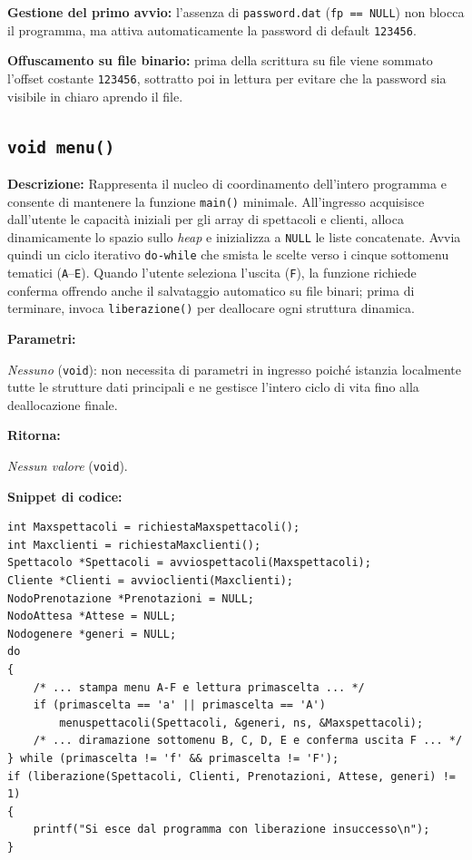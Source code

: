 \documentclass[11pt,a4paper,oneside,openany]{book}
\newenvironment{listacomp}{%
    \small
    \begin{list}{\textendash}{%
        \setlength{\topsep}{2pt}%
        \setlength{\partopsep}{0pt}%
        \setlength{\itemsep}{1pt}%
        \setlength{\parsep}{0pt}%
        \setlength{\leftmargin}{1.2em}%
    }%
}{%
    \end{list}%
}
\begin{document}
\begin{listacomp}
    \item \textbf{Gestione del primo avvio:} l'assenza di \texttt{password.dat} (\texttt{fp == NULL}) non blocca il programma, ma attiva automaticamente la password di default \texttt{123456}.
    \item \textbf{Offuscamento su file binario:} prima della scrittura su file viene sommato l'offset costante \texttt{123456}, sottratto poi in lettura per evitare che la password sia visibile in chiaro aprendo il file.
\end{listacomp}

\subsection[menu()]{\texttt{void menu()}}

\noindent\textbf{Descrizione:}
Rappresenta il nucleo di coordinamento dell'intero programma e consente di mantenere la funzione \texttt{main()} minimale. All'ingresso acquisisce dall'utente le capacità iniziali per gli array di spettacoli e clienti, alloca dinamicamente lo spazio sullo \emph{heap} e inizializza a \texttt{NULL} le liste concatenate. Avvia quindi un ciclo iterativo \texttt{do-while} che smista le scelte verso i cinque sottomenu tematici (\texttt{A}--\texttt{E}). Quando l'utente seleziona l'uscita (\texttt{F}), la funzione richiede conferma offrendo anche il salvataggio automatico su file binari; prima di terminare, invoca \texttt{liberazione()} per deallocare ogni struttura dinamica.

\noindent\textbf{Parametri:}
\begin{listacomp}
    \item \textit{Nessuno} (\texttt{void}): non necessita di parametri in ingresso poiché istanzia localmente tutte le strutture dati principali e ne gestisce l'intero ciclo di vita fino alla deallocazione finale.
\end{listacomp}

\noindent\textbf{Ritorna:}
\begin{listacomp}
    \item \textit{Nessun valore} (\texttt{void}).
\end{listacomp}

\noindent\textbf{Snippet di codice:}
\begin{lstlisting}[caption={Inizializzazione, ciclo principale e rilascio memoria in menu()}]
int Maxspettacoli = richiestaMaxspettacoli();
int Maxclienti = richiestaMaxclienti();
Spettacolo *Spettacoli = avviospettacoli(Maxspettacoli);
Cliente *Clienti = avvioclienti(Maxclienti);
NodoPrenotazione *Prenotazioni = NULL;
NodoAttesa *Attese = NULL;
Nodogenere *generi = NULL;
do
{
    /* ... stampa menu A-F e lettura primascelta ... */
    if (primascelta == 'a' || primascelta == 'A')
        menuspettacoli(Spettacoli, &generi, ns, &Maxspettacoli);
    /* ... diramazione sottomenu B, C, D, E e conferma uscita F ... */
} while (primascelta != 'f' && primascelta != 'F');
if (liberazione(Spettacoli, Clienti, Prenotazioni, Attese, generi) != 1)
{
    printf("Si esce dal programma con liberazione insuccesso\n");
}
\end{lstlisting}
\end{document}
